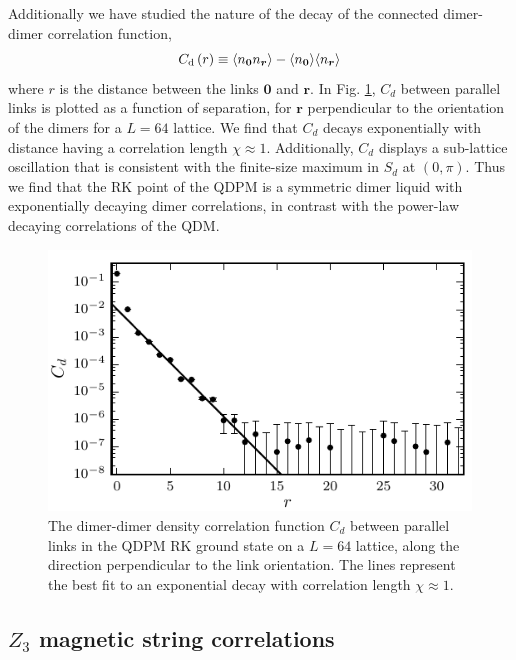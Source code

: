 \documentclass[twocolumn,prb,aps,floatfix,superscriptaddress]{revtex4-1}
\newcommand{\figref}[1]{Fig. \ref{#1}}
\begin{document}
Additionally we have studied the nature of the decay of the connected dimer-dimer correlation function,
  \begin{equation}
    C_{\mathrm{d}} \left(r\right) \equiv \langle n_{\bm{0}} n_{\bm{r}} \rangle - \langle n_{\bm{0}} \rangle   \langle n_{\bm{r}} \rangle   \notag
\end{equation}
where $r$ is the distance between the links $\bm{0}$ and $\bm{r}$. In \figref{fig:spatial_dmr_cor}, $C_d$ between parallel links is plotted as a function of separation, for $\bm{r}$ perpendicular to the orientation of the dimers for a $L=64$ lattice. We find that $C_d$ decays exponentially with distance having a correlation length  $\chi\approx 1$. Additionally, $C_d$ displays a sub-lattice oscillation that is consistent with the finite-size maximum in $S_d$ at $(0,\pi)$. Thus we find that the RK point of the QDPM is a symmetric dimer liquid with exponentially decaying dimer correlations, in contrast with the power-law decaying correlations of the QDM.
\begin{figure}[]
    \centering
    \includegraphics[width=1.0\columnwidth]{spatial_cors_parallel.pdf}
    \caption{The dimer-dimer density correlation function $C_d$ between parallel links in the QDPM RK ground state on a $L=64$ lattice, along the direction perpendicular to the link orientation.  The lines represent the best fit to an exponential decay with correlation length $\chi\approx 1$.}
    \label{fig:spatial_dmr_cor}
\end{figure}


\subsection{$Z_3$ magnetic string correlations}
\end{document}
